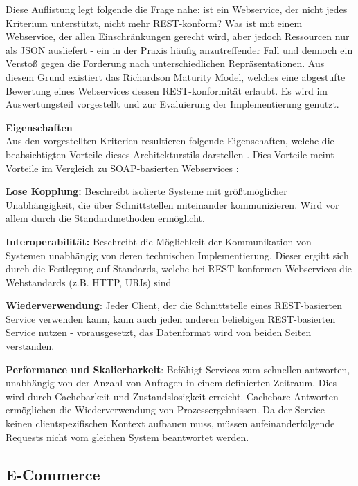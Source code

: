 \documentclass[12pt,a4paper,bibliography=totocnumbered,listof=totoc]{scrartcl}
\begin{document}
Diese Auflistung legt folgende die Frage nahe: ist ein Webservice, der nicht jedes Kriterium unterstützt, nicht mehr REST-konform? Was ist mit einem Webservice, der allen Einschränkungen gerecht wird, aber jedoch Ressourcen nur als JSON ausliefert - ein in der Praxis häufig anzutreffender Fall und dennoch ein Verstoß gegen die Forderung nach unterschiedlichen Repräsentationen. Aus diesem Grund existiert das \glqq Richardson Maturity Model\grqq{}, welches eine abgestufte Bewertung eines Webservices dessen REST-konformität erlaubt. Es wird im Auswertungsteil vorgestellt und zur Evaluierung der Implementierung genutzt.

\textbf{Eigenschaften}\\
Aus den vorgestellten Kriterien resultieren folgende Eigenschaften, welche die beabsichtigten Vorteile dieses Architekturstils darstellen \citep{tilkov11}. Dies Vorteile meint Vorteile im Vergleich zu SOAP-basierten Webservices \citep{richardson07}:

\begin{compactitem}
\item \textbf{Lose Kopplung:} Beschreibt isolierte Systeme mit größtmöglicher Unabhängigkeit, die über Schnittstellen miteinander kommunizieren. Wird vor allem  durch die Standardmethoden ermöglicht.
\item \textbf{Interoperabilität:} Beschreibt die Möglichkeit der Kommunikation von Systemen unabhängig von deren technischen Implementierung. Dieser ergibt sich durch die Festlegung auf Standards, welche bei REST-konformen Webservices die Webstandards (z.B. HTTP, URIs) sind 
\item \textbf{Wiederverwendung}: Jeder Client, der die Schnittstelle eines REST-basierten Service verwenden kann, kann auch jeden anderen beliebigen REST-basierten Service nutzen - vorausgesetzt, das Datenformat wird von beiden Seiten verstanden.
\item \textbf{Performance und Skalierbarkeit}: Befähigt Services zum schnellen antworten, unabhängig von der Anzahl von Anfragen in einem definierten Zeitraum. Dies wird durch Cachebarkeit und Zustandslosigkeit erreicht. Cachebare Antworten ermöglichen die Wiederverwendung von Prozessergebnissen. Da der Service keinen clientspezifischen Kontext aufbauen muss, müssen aufeinanderfolgende Requests nicht vom gleichen System beantwortet werden.
\end{compactitem}

\subsection{E-Commerce}
\end{document}
